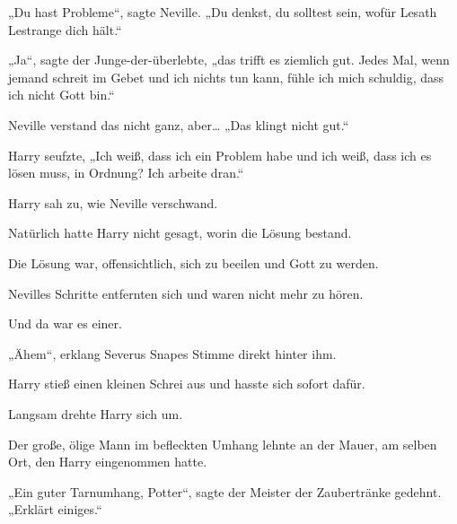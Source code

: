 „Du hast Probleme“, sagte Neville. „Du denkst, du solltest sein, wofür Lesath Lestrange dich hält.“

„Ja“, sagte der Junge-der-überlebte, „das trifft es ziemlich gut. Jedes Mal, wenn jemand schreit im Gebet und ich nichts tun kann, fühle ich mich schuldig, dass ich nicht Gott bin.“

Neville verstand das nicht ganz, aber… „Das klingt nicht gut.“

Harry seufzte, „Ich weiß, dass ich ein Problem habe und ich weiß, dass ich es lösen muss, in Ordnung? Ich arbeite dran.“

\later

Harry sah zu, wie Neville verschwand.

Natürlich hatte Harry nicht gesagt, worin die Lösung bestand.

Die Lösung war, offensichtlich, sich zu beeilen und Gott zu werden.

Nevilles Schritte entfernten sich und waren nicht mehr zu hören.

Und da war es einer.

„Ähem“, erklang Severus Snapes Stimme direkt hinter ihm.

Harry stieß einen kleinen Schrei aus und hasste sich sofort dafür.

Langsam drehte Harry sich um.

Der große, ölige Mann im befleckten Umhang lehnte an der Mauer, am selben Ort, den Harry eingenommen hatte.

„Ein guter Tarnumhang, Potter“, sagte der Meister der Zaubertränke gedehnt. „Erklärt einiges.“

